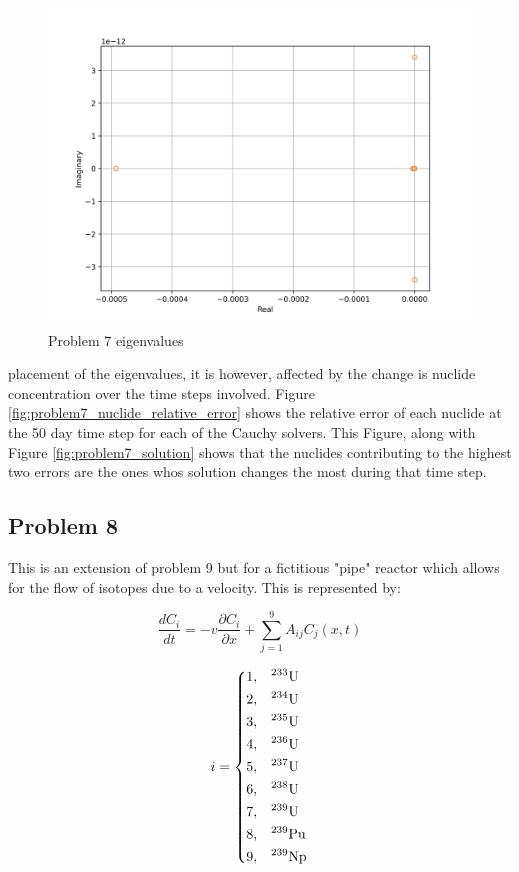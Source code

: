 \begin{figure}[p]
    \centering
    \includegraphics[width=6in]{images/chapter-5/progressionProblems/problem7/problem7Eigenvalues.png}
    \caption{Problem 7 eigenvalues}
    \label{fig:problem7_eigenvalues}
\end{figure}

\clearpage

\noindent placement of the eigenvalues, it is however, affected by the change is nuclide concentration over the time steps involved. Figure \ref{fig:problem7_nuclide_relative_error} shows the relative error of each nuclide at the 50 day time step for each of the Cauchy solvers. This Figure, along with Figure \ref{fig:problem7_solution} shows that the nuclides contributing to the highest two errors are the ones whos solution changes the most during that time step. 



\subsection{Problem 8}
This is an extension of problem 9 but for a fictitious "pipe" reactor which allows for the flow of isotopes due to a velocity. This is represented by:

\begin{equation}
\frac{d C_i}{dt} = -v\frac{\partial C_{i}}{\partial x} + \sum^9_{j = 1} A_{ij} C_j (x, t)
\end{equation}

\begin{equation}
i = \begin{dcases}
  1 , & \text{$^{233}$U}  \\
  2 , & \text{$^{234}$U}  \\
  3 , & \text{$^{235}$U}  \\
  4 , & \text{$^{236}$U}  \\
  5 , & \text{$^{237}$U}  \\
  6 , & \text{$^{238}$U}  \\
  7 , & \text{$^{239}$U}  \\
  8 , & \text{$^{239}$Pu} \\
  9 , & \text{$^{239}$Np} \\
\end{dcases}
\end{equation}

